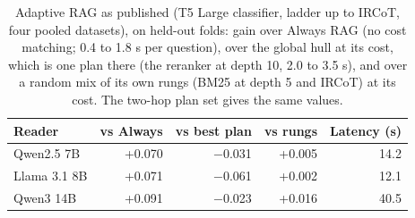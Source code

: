 \begin{table}[t]
\centering\small
\setlength{\tabcolsep}{4pt}
\caption{Adaptive RAG as published (T5 Large classifier, ladder up to IRCoT, four pooled datasets), on held-out folds: gain over Always RAG (no cost matching; 0.4 to 1.8 s per question), over the global hull at its cost, which is one plan there (the reranker at depth 10, 2.0 to 3.5 s), and over a random mix of its own rungs (BM25 at depth 5 and IRCoT) at its cost. The two-hop plan set gives the same values.}
\label{tab:arpub_col}
\begin{tabular*}{\linewidth}{@{\extracolsep{\fill}}lrrrr}
\toprule
Reader & vs Always & vs best plan & vs rungs & Latency (s) \\
\midrule
Qwen2.5 7B & +0.070 & $-$0.031 & +0.005 & 14.2 \\
Llama 3.1 8B & +0.071 & $-$0.061 & +0.002 & 12.1 \\
Qwen3 14B & +0.091 & $-$0.023 & +0.016 & 40.5 \\
\bottomrule
\end{tabular*}
\end{table}
